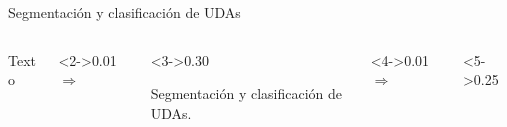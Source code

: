 \documentclass{beamer}
\begin{document}
\begin{frame}{Segmentación y clasificación de UDAs}

    \begin{columns}
        \begin{column}{0.10\textwidth}
            \begin{block}{}
                Texto
            \end{block}
        \end{column}
        \begin{column}<2->{0.01\textwidth}
            \begin{math}
                \Rightarrow
            \end{math}
        \end{column}
        \begin{column}<3->{0.30\textwidth}
            \begin{block}{}
                Segmentación y clasificación de UDAs.
            \end{block}
        \end{column}
        \begin{column}<4->{0.01\textwidth}
            \begin{math}
                \Rightarrow
            \end{math}
        \end{column}
        \begin{column}<5->{0.25\textwidth}
            
        \end{column}
    \end{columns}

    \vspace{1cm}


\end{frame}
\end{document}
